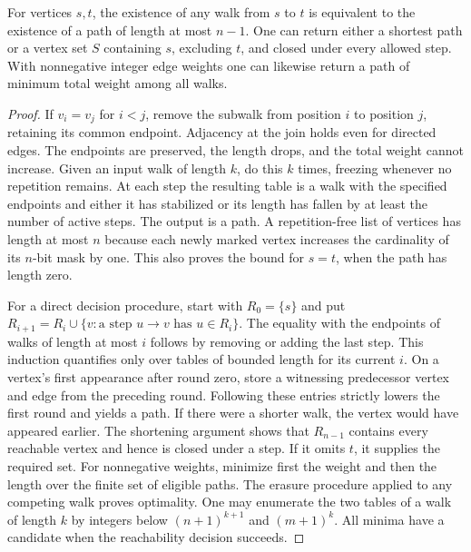 \begin{theorem}\leavevmode\label{stshort}
For vertices $s,t$, the existence of any walk from $s$ to $t$ is equivalent to the existence of a path of length at most $n-1$. One can return either a shortest path or a vertex set $S$ containing $s$, excluding $t$, and closed under every allowed step. With nonnegative integer edge weights one can likewise return a path of minimum total weight among all walks.
\end{theorem}
\begin{proof}
If $v_i=v_j$ for $i<j$, remove the subwalk from position $i$ to position $j$, retaining its common endpoint. Adjacency at the join holds even for directed edges. The endpoints are preserved, the length drops, and the total weight cannot increase. Given an input walk of length $k$, do this $k$ times, freezing whenever no repetition remains. At each step the resulting table is a walk with the specified endpoints and either it has stabilized or its length has fallen by at least the number of active steps. The output is a path. A repetition-free list of vertices has length at most $n$ because each newly marked vertex increases the cardinality of its $n$-bit mask by one. This also proves the bound for $s=t$, when the path has length zero.

For a direct decision procedure, start with $R_0=\{s\}$ and put $R_{i+1}=R_i\cup\{v:\text{a step }u\to v\text{ has }u\in R_i\}$. The equality with the endpoints of walks of length at most $i$ follows by removing or adding the last step. This induction quantifies only over tables of bounded length for its current $i$. On a vertex's first appearance after round zero, store a witnessing predecessor vertex and edge from the preceding round. Following these entries strictly lowers the first round and yields a path. If there were a shorter walk, the vertex would have appeared earlier. The shortening argument shows that $R_{n-1}$ contains every reachable vertex and hence is closed under a step. If it omits $t$, it supplies the required set. For nonnegative weights, minimize first the weight and then the length over the finite set of eligible paths. The erasure procedure applied to any competing walk proves optimality. One may enumerate the two tables of a walk of length $k$ by integers below $(n+1)^{k+1}$ and $(m+1)^k$. All minima have a candidate when the reachability decision succeeds.
\end{proof}

